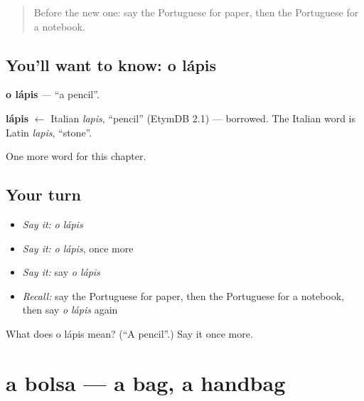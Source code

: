 \label{lesson:PT-C52-lapis}



\begin{quote}
Before the new one: say the Portuguese for paper, then the Portuguese for a notebook.
\end{quote}

\subsection*{You'll want to know: o lápis}
\textbf{o lápis} — \textquotedblleft{}a pencil\textquotedblright{}.

\begin{cousinweb}
\textbf{lápis} $\leftarrow$ Italian \emph{lapis}, \textquotedblleft{}pencil\textquotedblright{} (EtymDB 2.1) — borrowed. The Italian word is Latin \emph{lapis}, \textquotedblleft{}stone\textquotedblright{}.
\end{cousinweb}

\begin{grammarlens}[title={What you've built}]
One more word for this chapter.
\end{grammarlens}

\subsection*{Your turn}
\begin{itemize}
\raggedright
  \item \emph{Say it:} \emph{o lápis}
  \item \emph{Say it:} \emph{o lápis}, once more
  \item \emph{Say it:} say \emph{o lápis}
  \item \emph{Recall:} say the Portuguese for paper, then the Portuguese for a notebook, then say \emph{o lápis} again
\end{itemize}

\begin{tcolorbox}[breakable,colback=teal!4,colframe=teal!35!black,title={Before you move on}]
What does o lápis mean? (\textquotedblleft{}A pencil\textquotedblright{}.) Say it once more.
\end{tcolorbox}
\section[a bolsa]{a bolsa — a bag, a handbag}

\label{lesson:PT-C52-bolsa}



